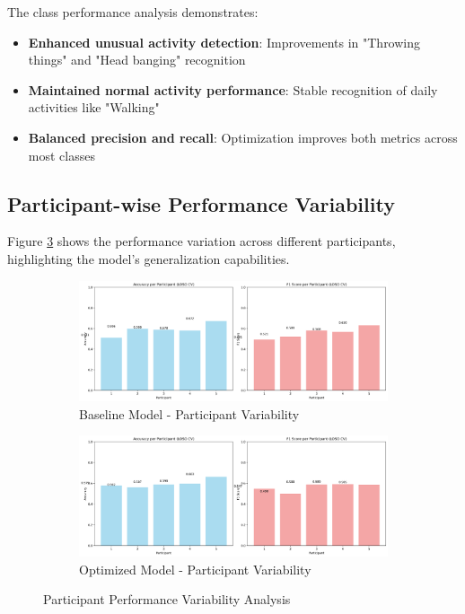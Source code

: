 \documentclass[a4paper,11pt]{article}
\begin{document}
The class performance analysis demonstrates:
\begin{itemize}
\item \textcolor{improvement}{\textbf{Enhanced unusual activity detection}}: Improvements in "Throwing things" and "Head banging" recognition
\item \textbf{Maintained normal activity performance}: Stable recognition of daily activities like "Walking"
\item \textbf{Balanced precision and recall}: Optimization improves both metrics across most classes
\end{itemize}

\subsection{Participant-wise Performance Variability}

Figure \ref{fig:participant_performance} shows the performance variation across different participants, highlighting the model's generalization capabilities.

\begin{figure}[H]
\centering
\begin{subfigure}{0.48\textwidth}
    \centering
    \includegraphics[width=\textwidth]{results/metrics/baseline/participant_performance.png}
    \caption{Baseline Model - Participant Variability}
    \label{fig:baseline_participants}
\end{subfigure}
\hfill
\begin{subfigure}{0.48\textwidth}
    \centering
    \includegraphics[width=\textwidth]{results/metrics/optimized/participant_performance.png}
    \caption{Optimized Model - Participant Variability}
    \label{fig:optimized_participants}
\end{subfigure}
\caption{Participant Performance Variability Analysis}
\label{fig:participant_performance}
\end{figure}
\end{document}
